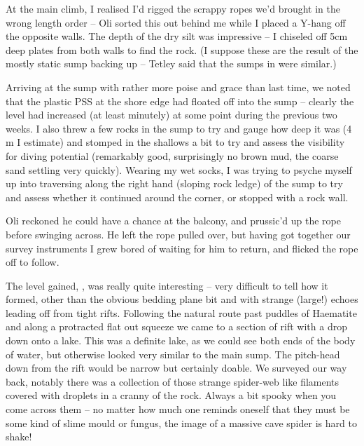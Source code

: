 At the main climb, I realised I'd rigged the scrappy ropes we'd brought
in the wrong length order -- Oli sorted this out behind me while I
placed a Y-hang off the opposite walls. The depth of the dry silt was
impressive -- I chiseled off 5cm deep plates from both walls to find the
rock. (I suppose these are the result of the mostly static sump backing up -- Tetley said that the sumps in  were similar.)

Arriving at the sump with rather more poise and grace than last time, we
noted that the plastic PSS at the shore edge had floated off into the
sump -- clearly the level had increased (at least minutely) at some
point during the previous two weeks. I also threw a few rocks in the
sump to try and gauge how deep it was (4 m I estimate) and stomped in
the shallows a bit to try and assess the visibility for diving potential
(remarkably good, surprisingly no brown mud, the coarse sand settling
very quickly). Wearing my wet socks, I was trying to psyche myself up
into traversing along the right hand (sloping rock ledge) of the sump to
try and assess whether it continued around the corner, or stopped with a
rock wall.


Oli reckoned he could have a chance at the balcony, and prussic'd up the
rope before swinging across. He left the rope pulled over, but having
got together our survey instruments I grew bored of waiting for him to
return, and flicked the rope off to follow.

The level gained, , was really quite interesting -- very
difficult to tell how it formed, other than the obvious bedding plane
bit and with strange (large!) echoes leading off from tight rifts.
Following the natural route past puddles of Haematite and along a
protracted flat out squeeze we came to a section of rift with a drop
down onto a lake. This was a definite lake, as we could see both ends of
the body of water, but otherwise looked very similar to the main sump.
The pitch-head down from the rift would be narrow but certainly doable.
We surveyed our way back, notably there was a collection of those
strange spider-web like filaments covered with droplets in a cranny of
the rock. Always a bit spooky when you come across them -- no matter how
much one reminds oneself that they must be some kind of slime mould or
fungus, the image of a massive cave spider is hard to shake!

